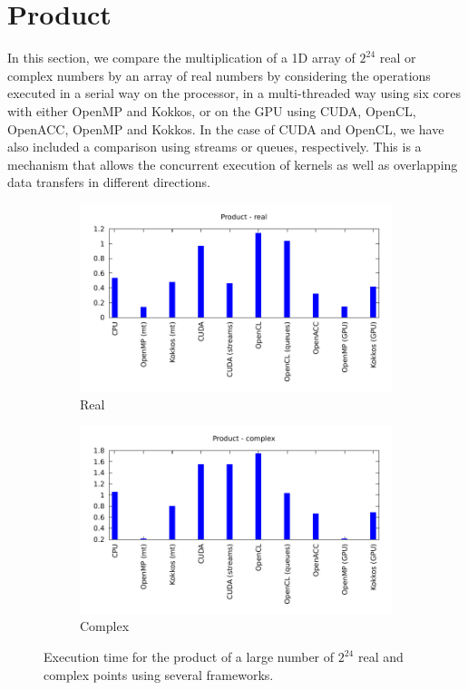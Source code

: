 \documentclass[12pt, a4paper]{article}
\begin{document}
\section{Product}\label{PRODUCT}
In this section, we compare the multiplication of a 1D array of $2^{24}$ real or
complex numbers by an array of real numbers by considering the
operations executed in a serial way on the processor, in a
multi-threaded way using six cores with either OpenMP and Kokkos, or
on the GPU using CUDA, OpenCL, OpenACC, OpenMP and Kokkos. In the case
of CUDA and OpenCL, we have also included a comparison using streams or
queues, respectively. This is a mechanism that allows the concurrent execution of
kernels as well as overlapping data transfers in different directions.
\begin{figure}[H]
\captionsetup{width=0.8\linewidth}
\centering
\begin{subfigure}{.5\textwidth}
\centering
\includegraphics[width=.9\linewidth]{graphs/product-r.pdf}
\caption{Real}
\label{PRODR}
\end{subfigure}%
\begin{subfigure}{.5\textwidth}
\centering
\includegraphics[width=.9\linewidth]{graphs/product-c.pdf}
\caption{Complex}
\label{PRODC}
\end{subfigure}
\caption{Execution time for the product of a large number of $2^{24}$ real and complex points using several frameworks.}
\label{1DFFTW}
\end{figure}
\end{document}
